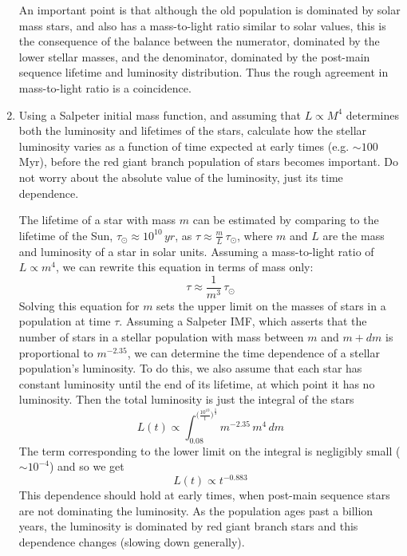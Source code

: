 \begin{enumerate}
\begin{answer}
An important point is that although the old population is dominated by
solar mass stars, and also has a mass-to-light ratio similar to solar
values, this is the consequence of the balance between the numerator,
dominated by the lower stellar masses, and the denominator, dominated
by the post-main sequence lifetime and luminosity distribution. Thus
the rough agreement in mass-to-light ratio is a coincidence.
\end{answer}
\item Using a Salpeter initial mass function, and assuming that
$L\propto M^4$ determines both the luminosity and lifetimes of the
stars, calculate how the stellar luminosity varies as a function of
time expected at early times (e.g. $\sim 100$ Myr), before the red
giant branch population of stars becomes important. Do not worry about
the absolute value of the luminosity, just its time dependence.

\begin{answer}
The lifetime of a star with mass $m$ can be estimated by comparing to
the lifetime of the Sun, $\tau_{\odot} \approx 10^{10} \, yr$, as
$\tau \approx \frac{m}{L} \, \tau_{\odot}$, where $m$ and $L$ are the
mass and luminosity of a star in solar units. Assuming a mass-to-light
ratio of $L \propto m^4$, we can rewrite this equation in terms of
mass only:
\begin{equation}
\tau \approx \frac{1}{m^3} \, \tau_{\odot}
\end{equation}
Solving this equation for $m$ sets the upper limit on the masses of
stars in a population at time $\tau$. Assuming a Salpeter IMF, which
asserts that the number of stars in a stellar population with mass
between $m$ and $m+dm$ is proportional to $m^{-2.35}$, we can
determine the time dependence of a stellar population's luminosity. To
do this, we also assume that each star has constant luminosity until
the end of its lifetime, at which point it has no luminosity. Then the
total luminosity is just the integral of the stars
\begin{equation}
L(t) \propto \int_{0.08}^{\big( \frac{10^{10}}{t} \big) ^{\frac{1}{3}}} m^{-2.35} \, m^4 \, dm
\end{equation}
The term corresponding to the lower limit on the integral is
negligibly small ($\sim 10^{-4}$) and so we get
\begin{equation}
L(t) \propto t^{-0.883}
\end{equation}
This dependence should hold at early times, when post-main sequence
stars are not dominating the luminosity. As the population ages past a
billion years, the luminosity is dominated by red giant branch stars
and this dependence changes (slowing down generally).
\end{answer}


\end{enumerate}

